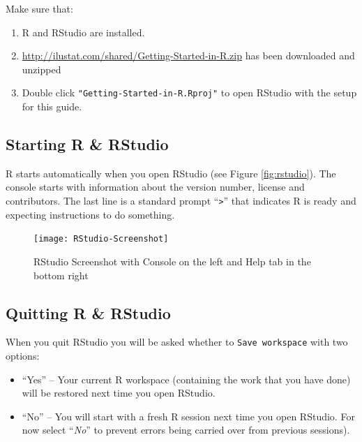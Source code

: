 \documentclass[letterpaperpaper,9pt,twocolumn,twoside,printwatermark=false]{pinp}
\providecommand{\tightlist}{%
  \setlength{\itemsep}{0pt}\setlength{\parskip}{0pt}}
\begin{document}
Make sure that:

\begin{enumerate}
\def\labelenumi{\arabic{enumi}.}
\tightlist
\item
  R and RStudio are installed.
\item
  \url{http://ilustat.com/shared/Getting-Started-in-R.zip} has been
  downloaded and unzipped
\item
  Double click \texttt{"Getting-Started-in-R.Rproj"} to open RStudio
  with the setup for this guide.
\end{enumerate}

\hypertarget{starting-r-rstudio}{%
\subsection{Starting R \& RStudio}\label{starting-r-rstudio}}

R starts automatically when you open RStudio (see Figure
\ref{fig:rstudio}). The console starts with information about the
version number, license and contributors. The last line is a standard
prompt ``\texttt{\textgreater{}}'' that indicates R is ready and
expecting instructions to do something.

\begin{figure}[H]

{\centering \texttt{[image: RStudio-Screenshot]} 

}

\caption{\label{fig:rstudio}RStudio Screenshot with Console on the left and  Help tab in the bottom right}\label{fig:RStudioScreenshot}
\end{figure}

\hypertarget{quitting-r-rstudio}{%
\subsection{Quitting R \& RStudio}\label{quitting-r-rstudio}}

When you quit RStudio you will be asked whether to
\texttt{Save\ workspace} with two options:

\begin{itemize}
\tightlist
\item
  ``Yes'' -- Your current R workspace (containing the work that you have
  done) will be restored next time you open RStudio.
\item
  ``No'' -- You will start with a fresh R session next time you open
  RStudio. For now select ``\emph{No}'' to prevent errors being carried
  over from previous sessions).
\end{itemize}
\end{document}
